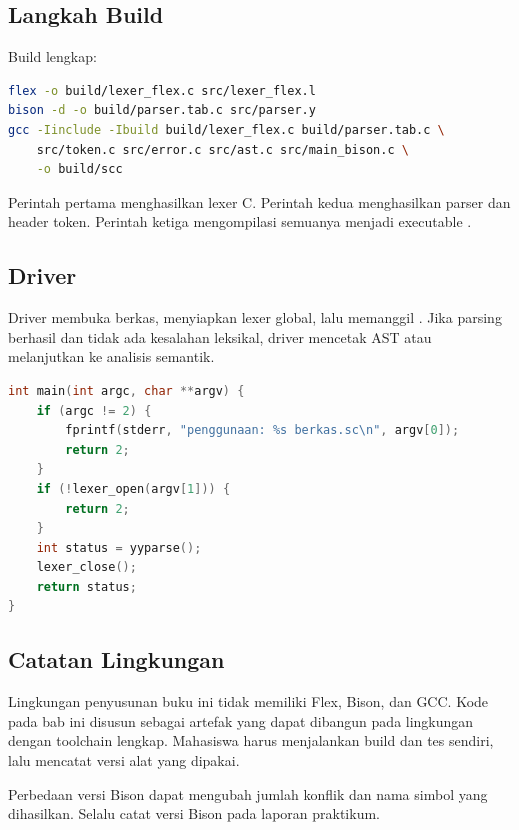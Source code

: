 \subsection{Langkah Build}

Build lengkap:
\begin{lstlisting}[language=bash]
flex -o build/lexer_flex.c src/lexer_flex.l
bison -d -o build/parser.tab.c src/parser.y
gcc -Iinclude -Ibuild build/lexer_flex.c build/parser.tab.c \
    src/token.c src/error.c src/ast.c src/main_bison.c \
    -o build/scc
\end{lstlisting}

Perintah pertama menghasilkan lexer C. Perintah kedua menghasilkan
parser dan header token. Perintah ketiga mengompilasi semuanya
menjadi executable \code{scc}.

\subsection{Driver}

Driver membuka berkas, menyiapkan lexer global, lalu memanggil
. Jika parsing berhasil dan tidak ada kesalahan
leksikal, driver mencetak AST atau melanjutkan ke analisis semantik.

\begin{lstlisting}[language=C]
int main(int argc, char **argv) {
    if (argc != 2) {
        fprintf(stderr, "penggunaan: %s berkas.sc\n", argv[0]);
        return 2;
    }
    if (!lexer_open(argv[1])) {
        return 2;
    }
    int status = yyparse();
    lexer_close();
    return status;
}
\end{lstlisting}

\subsection{Catatan Lingkungan}

Lingkungan penyusunan buku ini tidak memiliki Flex, Bison, dan GCC.
Kode pada bab ini disusun sebagai artefak yang dapat dibangun pada
lingkungan dengan toolchain lengkap. Mahasiswa harus menjalankan
build dan tes sendiri, lalu mencatat versi alat yang dipakai.

\begin{warningbox}
Perbedaan versi Bison dapat mengubah jumlah konflik dan nama simbol
yang dihasilkan. Selalu catat versi Bison pada laporan praktikum.
\end{warningbox}
